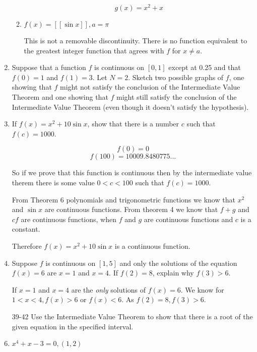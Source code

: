 \documentclass{article}
\begin{document}
\begin{enumerate}
\begin{enumerate}
				$$g(x) = x^2 + x$$	

				\item $f(x) = [[\sin x]], a = \pi$

				This is not a removable discontinuity. There is no function equivalent
				to the greatest integer function that agrees with $f$ for $x \neq a$.	
			\end{enumerate}

			\item Suppose that a function $f$ is continuous on $[0, 1]$ except at 0.25
				and that $f(0) = 1$ and $f(1) = 3$. Let $N = 2$. Sketch two possible
				graphs of $f$, one showing that $f$ might not satisfy the conclusion
				of the Intermediate Value Theorem and one showing that $f$ might still
				satisfy the conclusion of the Intermediate Value Theorem (even though
				it doesn't satisfy the hypothesis).


			\item If $f(x) = x^2 + 10 \sin x$, show that there is a number $c$ such that
				$f(c) = 1000$.

			$$f(0) = 0$$
			$$f(100) = 10009.8480775...$$

			So if we prove that this function is continuous then by the intermediate value
			therem there is some value $0 < c < 100$ such that $f(c) = 1000$.

			From Theorem 6 polynomials and trigonometric functions we know that $x^2$
			and $\sin x$ are continuous functions. From theorem 4 we know that 
			$f + g$ and $cf$ are continuous functions, when $f$ and $g$ are continuous
			functions and $c$ is a constant.

			Therefore $f(x) = x^2 + 10\sin x$ is a continuous function.	

			\item Suppose $f$ is continuous on $[1,5]$ and only the solutions of the equation
				$f(x) = 6$ are $x = 1$ and $x = 4$. If $f(2) = 8$, explain why $f(3) > 6$.

				If $x = 1$ and $x = 4$ are the \emph{only} solutions of $f(x) = 6$. We know for 
				$1 < x < 4, f(x) > 6 \text{ or } f(x) < 6$. As $f(2) = 8, f(3) > 6$.

			\item[39-42] Use the Intermediate Value Theorem to show that there is a root of the
				given equation in the specified interval.

			\item $x^4 + x - 3 = 0, (1,2)$


\end{enumerate}
\end{document}
